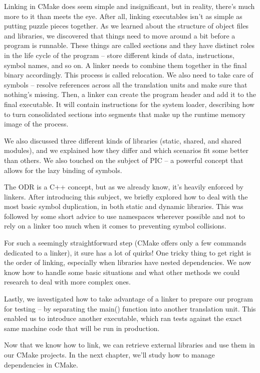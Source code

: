 Linking in CMake does seem simple and insignificant, but in reality, there's much more to it than meets the eye. After all, linking executables isn't as simple as putting puzzle pieces together. As we learned about the structure of object files and libraries, we discovered that things need to move around a bit before a program is runnable. These things are called sections and they have distinct roles in the life cycle of the program – store different kinds of data, instructions, symbol names, and so on. A linker needs to combine them together in the final binary accordingly. This process is called relocation.
We also need to take care of symbols – resolve references across all the translation units and make sure that nothing's missing. Then, a linker can create the program header and add it to the final executable. It will contain instructions for the system loader, describing how to turn consolidated sections into segments that make up the runtime memory image of the process.

We also discussed three different kinds of libraries (static, shared, and shared modules), and we explained how they differ and which scenarios fit some better than others. We also touched on the subject of PIC – a powerful concept that allows for the lazy binding of symbols.

The ODR is a C++ concept, but as we already know, it's heavily enforced by linkers. After introducing this subject, we briefly explored how to deal with the most basic symbol duplication, in both static and dynamic libraries. This was followed by some short advice to use namespaces wherever possible and not to rely on a linker too much when it comes to preventing symbol collisions.

For such a seemingly straightforward step (CMake offers only a few commands dedicated to a linker), it sure has a lot of quirks! One tricky thing to get right is the order of linking, especially when libraries have nested dependencies. We now know how to handle some basic situations and what other methods we could research to deal with more complex ones.

Lastly, we investigated how to take advantage of a linker to prepare our program for testing – by separating the main() function into another translation unit. This enabled us to introduce another executable, which ran tests against the exact same machine code that will be run in production.

Now that we know how to link, we can retrieve external libraries and use them in our CMake projects. In the next chapter, we'll study how to manage dependencies in CMake.